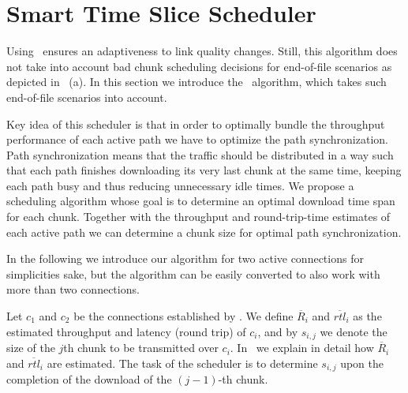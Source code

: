 \section{Smart Time Slice Scheduler}
\label{sec:synchronization-approach}

Using \algalpha~ensures an adaptiveness to link quality changes. 
Still, this algorithm does not take into account bad chunk scheduling decisions for end-of-file scenarios as depicted in~ (a). 
In this section we introduce the \algslice~algorithm, which takes such end-of-file scenarios into account. 

Key idea of this scheduler is that in order to optimally bundle the throughput performance of each active path we have to optimize the path synchronization. 
Path synchronization means that the traffic should be distributed in a way such that each path finishes downloading its very last chunk at the same time, keeping each path busy and thus reducing unnecessary idle times.
We propose a scheduling algorithm whose goal is to determine an optimal download time span for each chunk. 
Together with the throughput and round-trip-time estimates of each active path we can determine a chunk size for optimal path synchronization.

In the following we introduce our algorithm for two active connections for simplicities sake, but the algorithm can be easily converted to also work with more than two connections.

Let $c_1$ and $c_2$ be the connections established by \mhttp. 
We define $\overline{R}_i$ and $\overline{rtl}_i$ as the estimated throughput and latency (round trip) of $c_i$, and by $s_{i,j}$ we denote the size of the $j$th chunk to be transmitted over $c_i$. 
In~ we explain in detail how $\overline{R}_i$ and $\overline{rtl}_i$ are estimated.
The task of the scheduler is to determine $s_{i,j}$ upon the completion of the download of the $(j-1)$-th chunk.



%

